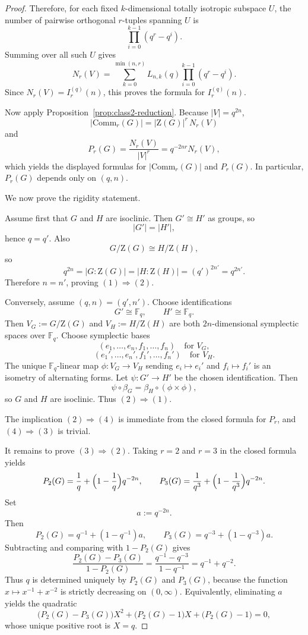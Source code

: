 \documentclass[10pt,a4paper]{amsart}
\newcommand{\Comm}{\mathrm{Comm}}
\newcommand{\Z}{\mathrm{Z}}
\begin{document}
\begin{proof}
Therefore, for each fixed $k$-dimensional totally isotropic subspace $U$, the number of pairwise orthogonal
$r$-tuples spanning $U$ is
\[
\prod_{i=0}^{k-1}(q^r-q^i).
\]
Summing over all such $U$ gives
\[
N_r(V)
=
\sum_{k=0}^{\min(n,r)}
L_{n,k}(q)\prod_{i=0}^{k-1}(q^r-q^i).
\]
Since $N_r(V)=I_r^{(q)}(n)$, this proves the formula for $I_r^{(q)}(n)$.

Now apply Proposition~\ref{prop:class2-reduction}. Because $|V|=q^{2n}$,
\[
|\Comm_r(G)|=|\Z(G)|^r\,N_r(V)
\]
and
\[
P_r(G)=\frac{N_r(V)}{|V|^r}=q^{-2nr}N_r(V),
\]
which yields the displayed formulas for $|\Comm_r(G)|$ and $P_r(G)$.
In particular, $P_r(G)$ depends only on $(q,n)$.

We now prove the rigidity statement.

Assume first that $G$ and $H$ are isoclinic.
Then $G'\cong H'$ as groups, so
\[
|G'|=|H'|,
\]
hence $q=q'$.
Also
\[
G/\Z(G)\cong H/\Z(H),
\]
so
\[
q^{2n}=|G:\Z(G)|=|H:\Z(H)|=(q')^{2n'}=q^{2n'}.
\]
Therefore $n=n'$, proving $(1)\Rightarrow(2)$.

Conversely, assume $(q,n)=(q',n')$.
Choose identifications
\[
G'\cong \mathbb F_q,\qquad H'\cong \mathbb F_q.
\]
Then $V_G:=G/\Z(G)$ and $V_H:=H/\Z(H)$ are both $2n$-dimensional symplectic spaces over $\mathbb F_q$.
Choose symplectic bases
\[
(e_1,\dots,e_n,f_1,\dots,f_n)\quad\text{for }V_G,
\]
\[
(e_1',\dots,e_n',f_1',\dots,f_n')\quad\text{for }V_H.
\]
The unique $\mathbb F_q$-linear map $\phi:V_G\to V_H$ sending $e_i\mapsto e_i'$ and $f_i\mapsto f_i'$
is an isometry of alternating forms.
Let $\psi:G'\to H'$ be the chosen identification.
Then
\[
\psi\circ \beta_G=\beta_H\circ(\phi\times\phi),
\]
so $G$ and $H$ are isoclinic. Thus $(2)\Rightarrow(1)$.

The implication $(2)\Rightarrow(4)$ is immediate from the closed formula for $P_r$,
and $(4)\Rightarrow(3)$ is trivial.

It remains to prove $(3)\Rightarrow(2)$.
Taking $r=2$ and $r=3$ in the closed formula yields
\[
P_2(G)=\frac1q+\Bigl(1-\frac1q\Bigr)q^{-2n},
\qquad
P_3(G)=\frac1{q^3}+\Bigl(1-\frac1{q^3}\Bigr)q^{-2n}.
\]
Set
\[
a:=q^{-2n}.
\]
Then
\[
P_2(G)=q^{-1}+(1-q^{-1})a,\qquad
P_3(G)=q^{-3}+(1-q^{-3})a.
\]
Subtracting and comparing with $1-P_2(G)$ gives
\[
\frac{P_2(G)-P_3(G)}{1-P_2(G)}
=
\frac{q^{-1}-q^{-3}}{1-q^{-1}}
=
q^{-1}+q^{-2}.
\]
Thus $q$ is determined uniquely by $P_2(G)$ and $P_3(G)$, because the function
$x\mapsto x^{-1}+x^{-2}$ is strictly decreasing on $(0,\infty)$.
Equivalently, eliminating $a$ yields the quadratic
\[
\bigl(P_2(G)-P_3(G)\bigr)X^2+\bigl(P_2(G)-1\bigr)X+\bigl(P_2(G)-1\bigr)=0,
\]
whose unique positive root is $X=q$.


\end{proof}
\end{document}
